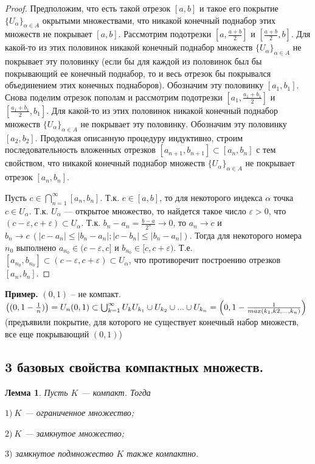 \documentclass[12pt]{article}
\newtheorem{lemma}[theorem]{Лемма}
\theoremstyle{definition}
\begin{document}
\begin{proof}
Предположим, что есть такой отрезок $[a, b]$ и такое его покрытие $\{U_\alpha\}_{\alpha\in A}$
окрытыми множествами, что никакой конечный поднабор этих множеств не покрывает $[a, b]$.
Рассмотрим подотрезки $[a, \frac{a+b}{2}]$ и $[\frac{a+b}{2}, b]$.
Для какой-то из этих половинок никакой конечный поднабор множеств
$\{U_\alpha\}_{\alpha\in A}$ не покрывает эту половинку (если бы для каждой из половинок
был бы покрывающий ее конечный поднабор,
то и весь отрезок бы покрывался объединением этих конечных поднаборов).
Обозначим эту половинку $[a_1, b_1]$. Снова поделим отрезок пополам
и рассмотрим подотрезки $[a_1, \frac{a_1+b_1}{2}]$ и $[\frac{a_1+b_1}{2}, b_1]$.
Для какой-то из этих половинок никакой конечный поднабор множеств
$\{U_\alpha\}_{\alpha\in A}$ не покрывает эту половинку.
Обозначим эту половинку $[a_2, b_2]$.
Продолжая описанную процедуру индуктивно, строим последовательность вложенных отрезков
$[a_{n+1}, b_{n+1}]\subset [a_n, b_n]$ с тем свойством, что
никакой конечный поднабор множеств
$\{U_\alpha\}_{\alpha\in A}$ не покрывает отрезок $[a_n, b_n]$.

Пусть $c\in \bigcap_{n=1}^\infty[a_n, b_n]$. Т.к. $c\in [a, b]$, то для некоторого
индекса $\alpha$ точка $c\in U_\alpha$. Т.к. $U_\alpha$ --- открытое множество,
то найдется такое число $\varepsilon>0$, что $(c-\varepsilon, c+\varepsilon)\subset U_\alpha$.
Т.к. $b_n-a_n = \frac{b-a}{2^n}\to 0$, то $a_n\to c$ и $b_n\to c\ (|c - a_n|\leq |b_n - a_n|; |c - b_n|\leq |b_n - a_n|)$.
Тогда для некоторого номера $n_0$ выполнено $a_{n_0}\in (c-\varepsilon, c]$
и $b_{n_0}\in [c, c+\varepsilon)$. Т.е.
$[a_{n_0}, b_{n_0}]\subset (c-\varepsilon, c+\varepsilon)\subset U_\alpha$,
что противоречит построению отрезков $[a_n, b_n]$.
\end{proof} 
\textbf{Пример.} $(0, 1)$ -- не компакт. \\ $\left((0, 1-\frac{1}{n})\right) = U_n \\ (0,1) \subset \bigcup_{k=1}^\infty U_k \\ U_{k_1} \cup U_{k_2} \cup ... \cup U_{k_n} = \left(0, 1 - \frac{1}{max(k_1, k2, ..., k_n)}\right)$ (предъявили покрытие, для которого не существует конечный набор множеств, все еще покрывающий $(0, 1)$)
\subsection{3 базовых свойства компактных множеств.}

\begin{lemma} Пусть $K$ --- компакт. Тогда

$1)\ K$ --- ограниченное множество;

$2)\ K$ --- замкнутое множество;

$3)$ замкнутое подмножество $K$ также компактно.
\end{lemma}
\end{document}
